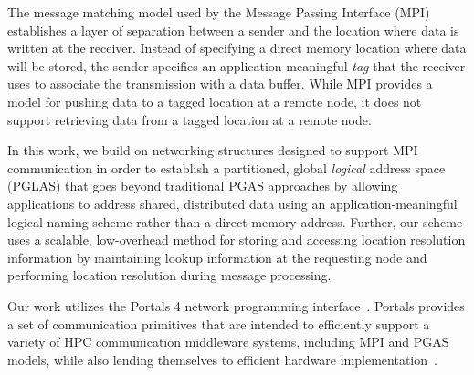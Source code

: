 The message matching model used by the Message Passing Interface
(MPI)~\cite{mpi-forum:15} establishes a layer of separation between a
sender and the location where data is written at the receiver.
Instead of specifying a direct memory location where data will be
stored, the sender specifies an application-meaningful {\em tag} that
the receiver uses to associate the transmission with a data buffer.
While MPI provides a model for pushing data to a tagged location at a
remote node, it does not support retrieving data from a tagged
location at a remote node.


In this work, we build on networking structures designed to support
MPI communication in order to establish a partitioned, global {\em
  logical} address space (PGLAS) that goes beyond traditional PGAS
approaches by allowing applications to address shared, distributed
data using an application-meaningful logical naming scheme rather than
a direct memory address.  Further, our scheme uses a scalable,
low-overhead method for storing and accessing location resolution
information by maintaining lookup information at the requesting node
and performing location resolution during message processing.

Our work utilizes the Portals 4 network programming
interface~\cite{portals4}.  Portals provides a set of communication
primitives that are intended to efficiently support a variety of HPC
communication middleware systems, including MPI and PGAS models, while
also lending themselves to efficient hardware
implementation~\cite{brightwell:micro:06,bxi}.


